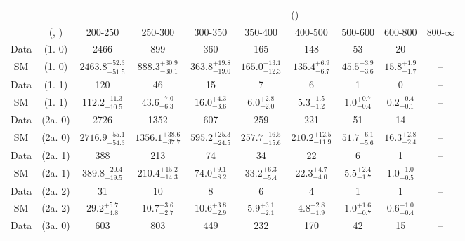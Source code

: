 \begin{table}[h!]
\tiny
\centering
{}
\begin{tabular}
{cccccccccc}
	\hline\hline
&	&	& \multicolumn{8}{c}{\scalht (\gev)}\\ 
	&	 (\njet, \nb) & 200-250 & 250-300 & 300-350 & 350-400 & 400-500 & 500-600 & 600-800 & 800-$\infty$ \\ [0.8ex] 
\hline
	Data & (1. 0) & 2466 & 899 & 360 & 165 & 148 & 53 & 20 & -- \\[0.5ex] 
	SM & (1. 0) & $2463.8^{+ 52.3 }_{- 51.5 }$ & $888.3^{+ 30.9 }_{- 30.1 }$ & $363.8^{+ 19.8 }_{- 19.0 }$ & $165.0^{+ 13.1 }_{- 12.3 }$ & $135.4^{+ 6.9 }_{- 6.7 }$ & $45.5^{+ 3.9 }_{- 3.6 }$ & $15.8^{+ 1.9 }_{- 1.7 }$ & -- \\[0.5ex] 
	Data & (1. 1) & 120 & 46 & 15 & 7 & 6 & 1 & 0 & -- \\[0.5ex] 
	SM & (1. 1) & $112.2^{+ 11.3 }_{- 10.5 }$ & $43.6^{+ 7.0 }_{- 6.3 }$ & $16.0^{+ 4.3 }_{- 3.6 }$ & $6.0^{+ 2.8 }_{- 2.0 }$ & $5.3^{+ 1.5 }_{- 1.2 }$ & $1.0^{+ 0.7 }_{- 0.4 }$ & $0.2^{+ 0.4 }_{- 0.1 }$ & -- \\[0.5ex] 
	Data & (2a. 0) & 2726 & 1352 & 607 & 259 & 221 & 51 & 14 & -- \\[0.5ex] 
	SM & (2a. 0) & $2716.9^{+ 55.1 }_{- 54.3 }$ & $1356.1^{+ 38.6 }_{- 37.7 }$ & $595.2^{+ 25.3 }_{- 24.5 }$ & $257.7^{+ 16.5 }_{- 15.6 }$ & $210.2^{+ 12.5 }_{- 11.9 }$ & $51.7^{+ 6.1 }_{- 5.6 }$ & $16.3^{+ 2.8 }_{- 2.4 }$ & -- \\[0.5ex] 
	Data & (2a. 1) & 388 & 213 & 74 & 34 & 22 & 6 & 1 & -- \\[0.5ex] 
	SM & (2a. 1) & $389.8^{+ 20.4 }_{- 19.5 }$ & $210.4^{+ 15.2 }_{- 14.3 }$ & $74.0^{+ 9.1 }_{- 8.2 }$ & $33.2^{+ 6.3 }_{- 5.4 }$ & $22.3^{+ 4.7 }_{- 4.0 }$ & $5.5^{+ 2.4 }_{- 1.7 }$ & $1.0^{+ 1.0 }_{- 0.5 }$ & -- \\[0.5ex] 
	Data & (2a. 2) & 31 & 10 & 8 & 6 & 4 & 1 & 1 & -- \\[0.5ex] 
	SM & (2a. 2) & $29.2^{+ 5.7 }_{- 4.8 }$ & $10.7^{+ 3.6 }_{- 2.7 }$ & $10.6^{+ 3.8 }_{- 2.9 }$ & $5.9^{+ 3.1 }_{- 2.1 }$ & $4.8^{+ 2.8 }_{- 1.9 }$ & $1.0^{+ 1.6 }_{- 0.7 }$ & $0.6^{+ 1.0 }_{- 0.4 }$ & -- \\[0.5ex] 
	Data & (3a. 0) & 603 & 803 & 449 & 232 & 170 & 42 & 15 & -- \\[0.5ex] 

\end{tabular}
\end{table}
